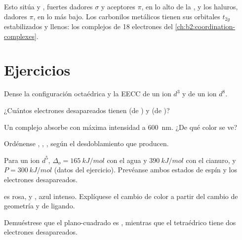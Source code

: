 Esto sitúa  y , fuertes dadores $\sigma$ y aceptores $\pi$, en lo alto de la
, y los haluros, dadores $\pi$, en lo más bajo. Los carbonilos metálicos tienen
sus orbitales $t_{2g}$ estabilizados y llenos: los complejos de 18 electrones del
\cref{ch:b2:coordination-complexes}.

\section{Ejercicios}

\begin{exercise}[$\star$]\label{exo:b2:ligand-field:1}
Dense la configuración octaédrica y la EECC de un ion $d^3$ y de un ion $d^8$.
\end{exercise}

\begin{exercise}[$\star$]\label{exo:b2:ligand-field:2}
¿Cuántos electrones desapareados tienen  (de ) y  (de )?
\end{exercise}

\begin{exercise}[$\star$]\label{exo:b2:ligand-field:3}
Un complejo absorbe con máxima intensidad a \qty{600}{nm}. ¿De qué color se ve?
\end{exercise}

\begin{exercise}[$\star$]\label{exo:b2:ligand-field:4}
Ordénense , , ,  según el desdoblamiento que producen.
\end{exercise}

\begin{exercise}[$\star\star$]\label{exo:b2:ligand-field:5}
Para un ion $d^5$, $\Delta_o = \qty{165}{kJ/mol}$ con el agua y $\qty{390}{kJ/mol}$ con el cianuro,
y $P = \qty{300}{kJ/mol}$ (datos del ejercicio). Prevéanse ambos estados de espín y los electrones
desapareados.
\end{exercise}

\begin{exercise}[$\star\star$]\label{exo:b2:ligand-field:6}
 es rosa, y , azul intenso. Explíquese el cambio de color a partir del
cambio de geometría y de ligando.
\end{exercise}

\begin{exercise}[$\star\star$]\label{exo:b2:ligand-field:7}
Demuéstrese que el  plano-cuadrado es , mientras que el
 tetraédrico tiene dos electrones desapareados.
\end{exercise}

